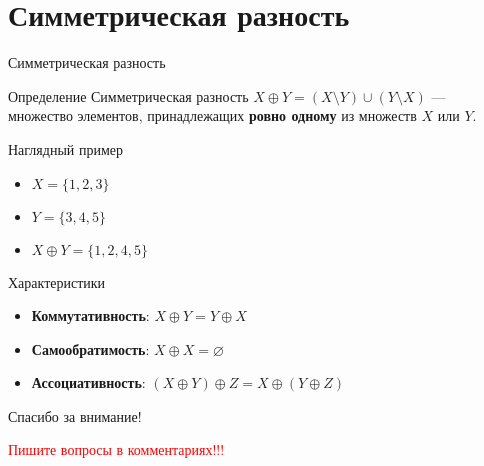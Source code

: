 \documentclass{beamer}
\begin{document}
\section{Симметрическая разность}
\begin{frame}{Симметрическая разность}
    \begin{block}{Определение}
        Симметрическая разность $X \oplus Y = (X \setminus Y) \cup (Y \setminus X)$ — множество элементов, принадлежащих \textbf{ровно одному} из множеств $X$ или $Y$.
    \end{block}
    \begin{exampleblock}{Наглядный пример}
        \begin{itemize}
            \item $X = \{1,2,3\}$
            \item $Y = \{3,4,5\}$
            \item $X \oplus Y = \{1,2,4,5\}$
        \end{itemize}
    \end{exampleblock}
    \begin{block}{Характеристики}
        \begin{itemize}
            \item \textbf{Коммутативность}: $X \oplus Y = Y \oplus X$
            \item \textbf{Самообратимость}: $X \oplus X = \varnothing$
            \item \textbf{Ассоциативность}: $(X \oplus Y) \oplus Z = X \oplus (Y \oplus Z)$
        \end{itemize}
    \end{block}
\end{frame}

\begin{frame}{}
    \centering
    \Large Спасибо за внимание!
    
    \vspace{1cm}
    \small \textcolor{red}{Пишите вопросы в комментариях!!!}
\end{frame}
\end{document}
